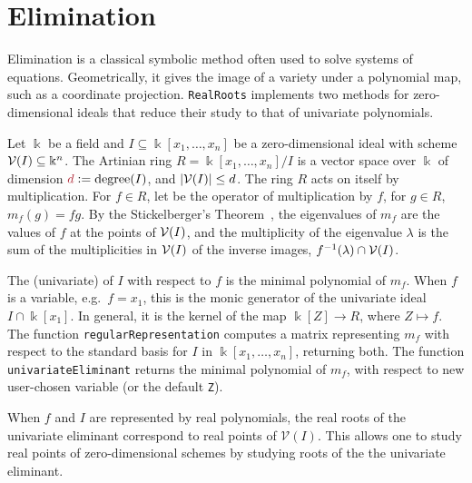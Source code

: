 


\section{Elimination}\label{S:two}

Elimination is a classical symbolic method often used to solve systems of equations.
Geometrically, it gives the image of a variety under a polynomial map, such as a coordinate projection.
\texttt{RealRoots} implements two methods for zero-dimensional ideals that reduce their study to that of univariate polynomials.

Let  $\Bbbk$ be a field and $I\subseteq\Bbbk[x_1,\dotsc,x_n]$ be a zero-dimensional ideal  with scheme $\mathcal{V}(I)\subseteq\Bbbk^n$.
The Artinian ring $R=\Bbbk[x_1,\dotsc,x_n]/I$ is a vector space over $\Bbbk$ of dimension $\defcolor{d}\vcentcolon=\mbox{degree}(I)$, and
$|\mathcal{V}(I)|\leq d$.
The ring $R$ acts on itself by multiplication.
For $f\in R$, let  be the operator of multiplication by $f$, for $g\in R$, $m_f(g)=fg$.
By the Stickelberger's Theorem~\cite{Cox2021}, the eigenvalues of $m_f$ are the values of $f$ at the  points of $\mathcal{V}(I)$,
and the multiplicity of the eigenvalue $\lambda$ is the sum of the multiplicities in $\mathcal{V}(I)$ of the inverse images,
$f^{-1}(\lambda)\cap\mathcal{V}(I)$. 


The (univariate)  of $I$ with respect to $f$ is the minimal polynomial of $m_f$.
When $f$ is a variable, e.g.\ $f=x_1$, this is the monic generator of the univariate ideal $I\cap\Bbbk[x_1]$.
In general, it is the kernel of the map $\Bbbk[Z]\to R$, where $Z\mapsto f$.
The function \texttt{regularRepresentation} computes a matrix representing $m_f$ with respect to the standard basis for $I$ in
$\Bbbk[x_1,\dotsc,x_n]$, returning both.
The function \texttt{univariateEliminant} returns the minimal polynomial of $m_f$, with respect to new user-chosen variable (or the default
\texttt{Z}).
%
\begin{leftbar}

\end{leftbar}
%

When $f$ and $I$ are represented by real polynomials, the real roots of the univariate eliminant correspond to real points of $\mathcal{V}(I)$. This allows one to study real points of zero-dimensional schemes by studying roots of the the univariate eliminant. 


